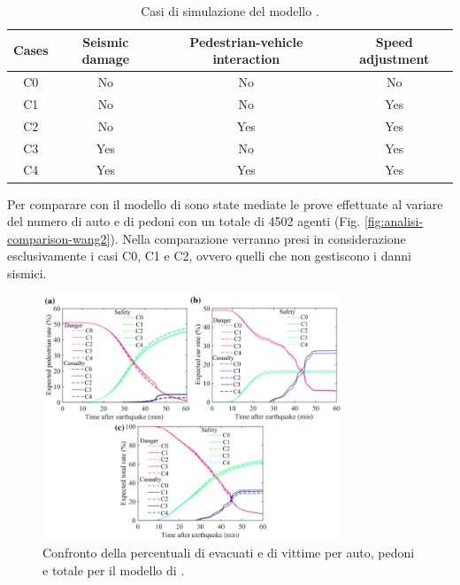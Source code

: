 \begin{table}[ht]
    \centering
    \begin{tabular}{|c|c|c|c|}
        \hline
        Cases & Seismic damage & Pedestrian-vehicle interaction & Speed adjustment \\ \hline
        C0    & No             & No                             & No               \\ \hline
        C1    & No             & No                             & Yes              \\ \hline
        C2    & No             & Yes                            & Yes              \\ \hline
        C3    & Yes            & No                             & Yes              \\ \hline
        C4    & Yes            & Yes                            & Yes              \\ \hline
    \end{tabular}
    \caption{Casi di simulazione del modello \textcite{wang2021novel}.}
    \label{tab:cases}
\end{table}

Per comparare con il modello di \textcite{wang2021novel} sono state mediate le prove effettuate al variare del numero
di auto e di pedoni con un totale di 4502 agenti (Fig. \ref{fig:analisi-comparison-wang2}).
Nella comparazione verranno presi in considerazione esclusivamente i casi C0, C1 e C2, ovvero quelli
che non gestiscono i danni sismici.

\begin{figure}[p]
    \centering
    \includegraphics[width=0.8\textwidth]{images/analisi/WANG_comparison1.png}
    \caption{Confronto della percentuali di evacuati e di vittime per auto, pedoni e totale per il modello di \textcite{wang2021novel}.}
    \label{fig:analisi-comparison-wang1}
\end{figure}

